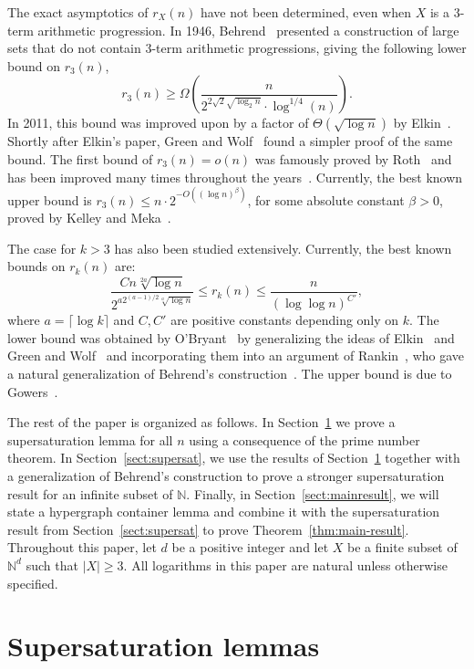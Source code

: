 \documentclass[12pt]{article}
\numberwithin{equation}{section}
\newcommand{\N}{\mathbb{N}}
\theoremstyle{definition}
\theoremstyle{remark}
\begin{document}
The exact asymptotics of $r_X(n)$ have not been determined, even when $X$ is a 3-term arithmetic progression. In 1946, Behrend~\cite{behrend} presented a construction of large sets that do not contain $3$-term arithmetic progressions, giving the following lower bound on $r_3(n)$,
\[r_3(n) \geq \Omega\left(\frac{n}{2^{2\sqrt{2}\sqrt{\log_2 n}}\cdot \log^{1/4}(n)} \right). \]
In 2011, this bound was improved upon by a factor of $\Theta(\sqrt{\log n})$ by Elkin~\cite{elkin}. Shortly after Elkin's paper, Green and Wolf~\cite{wolf} found a simpler proof of the same bound. The first bound of $r_3(n)=o(n)$ was famously proved by Roth~\cite{roth} and has been improved many times throughout the years~\cite{bloom,meka,Sanders,BloomSisask19,Bloom16,Schoen}. Currently, the best known upper bound is $r_3(n) \leq n \cdot 2^{-O((\log n)^\beta)}$, for some absolute constant $\beta>0$, proved by Kelley and Meka~\cite{meka}. 

The case for $k > 3$ has also been studied extensively. Currently, the best known bounds on $r_k(n)$ are:
\[\frac{Cn\sqrt[2a]{\log n}}{2^{a2^{(a-1)/2}\sqrt[a]{\log n}}} \leq r_k(n) \leq \frac{n}{(\log \log n)^{C'}} , \]
where $a = \lceil\log k\rceil$ and $C,C'$ are positive constants depending only on $k$. The lower bound was obtained by O'Bryant~\cite{obryant} by generalizing the ideas of Elkin~\cite{elkin} and Green and Wolf~\cite{wolf} and incorporating them into an argument of Rankin~\cite{rankin}, who gave a  natural generalization of Behrend's construction~\cite{behrend}. The upper bound is due to Gowers~\cite{gowers-fourier}. 





The rest of the paper is organized as follows. In Section~\ref{sect:supersat-lemmas} we prove a supersaturation lemma for all $n$ using a consequence of the prime number theorem. In Section~\ref{sect:supersat}, we use the results of Section~\ref{sect:supersat-lemmas} together with a generalization of Behrend's construction to prove a stronger supersaturation result for an infinite subset of $\mathbb{N}$. Finally, in Section~\ref{sect:mainresult}, we will state a hypergraph container lemma and combine it with the supersaturation result from Section~\ref{sect:supersat} to prove Theorem~\ref{thm:main-result}. Throughout this paper, let $d$ be a positive integer and let $X$ be a finite subset of $\N^d$ such that $|X| \geq 3$. All logarithms in this paper are natural unless otherwise specified. 

\section{Supersaturation lemmas}\label{sect:supersat-lemmas}
\end{document}

